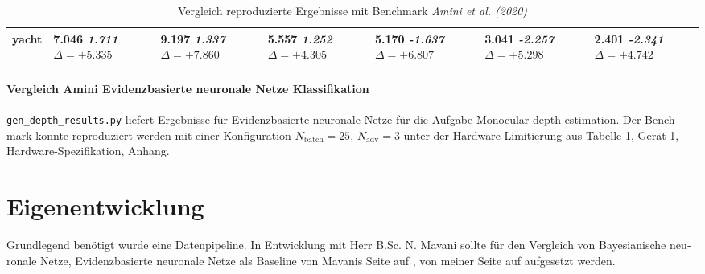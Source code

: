 \begin{otherlanguage}{ngerman}
\begin{table*}[!htbp]
\begin{tabularx}{\textwidth}{|l|X|X|X|X|X|X|}
yacht 
& 7.046 \newline \textit{1.711} \newline \mbox{$\Delta=+5.335$} 
& 9.197 \newline \textit{1.337} \newline \mbox{$\Delta=+7.860$} 
& 5.557 \newline \textit{1.252} \newline \mbox{$\Delta=+4.305$} 
& 5.170 \newline \textit{-1.637} \newline \mbox{$\Delta=+6.807$} 
& 3.041 \newline \textit{-2.257} \newline \mbox{$\Delta=+5.298$} 
& 2.401 \newline \textit{-2.341} \newline \mbox{$\Delta=+4.742$} \\ \hline
\end{tabularx}
\caption{Vergleich reproduzierte Ergebnisse mit Benchmark \textit{Amini et al. (2020)}}
\label{tab:comparison_ours_vs_amini_tabularx_v3}
\end{table*}


\paragraph{Vergleich Amini \gls{Evidenzbasierte neuronale Netze} Klassifikation} \parencite{amini2020deep} \texttt{gen\_depth\_results.py} liefert Ergebnisse für \gls{Evidenzbasierte neuronale Netze} für die Aufgabe \glqq Monocular depth estimation\grqq. Der Benchmark konnte reproduziert werden mit einer Konfiguration $N_\text{batch}=25$, $N_\text{adv}=3$ unter der Hardware-Limitierung aus Tabelle 1, Gerät 1, Hardware-Spezifikation, Anhang. %



\section*{Eigenentwicklung}

Grundlegend benötigt wurde eine Datenpipeline. In Entwicklung mit Herr B.Sc. N. Mavani sollte für den Vergleich von \gls{Bayesianische neuronale Netze}, \gls{Evidenzbasierte neuronale Netze} als Baseline von Mavanis Seite auf \parencite{Depeweg2019}, von meiner Seite auf \parencite{Ulmer2023} aufgesetzt werden.\newline


\end{otherlanguage}

